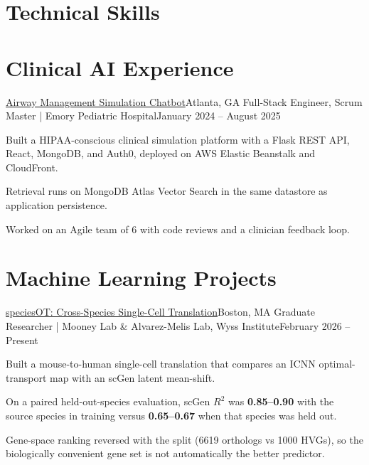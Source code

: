 \section{Technical Skills}
\resumeSubHeadingListStart
\resumeSubHeadingListEnd

\section{Clinical AI Experience}
\resumeSubHeadingListStart

  \resumeSubheading
    {\href{https://github.com/JunyiZhou-Conny/Airway-Management-Assistant}{Airway Management Simulation Chatbot}}{Atlanta, GA}
    {Full-Stack Engineer, Scrum Master | Emory Pediatric Hospital}{January 2024 -- August 2025}
    \resumeItemListStart
      \item Built a HIPAA-conscious clinical simulation platform with a Flask REST API, React, MongoDB, and Auth0, deployed on AWS Elastic Beanstalk and CloudFront.
      \item Retrieval runs on MongoDB Atlas Vector Search in the same datastore as application persistence.
      \item Worked on an Agile team of 6 with code reviews and a clinician feedback loop.
    \resumeItemListEnd

\resumeSubHeadingListEnd

\section{Machine Learning Projects}
\resumeSubHeadingListStart

  \resumeSubheading
    {\href{https://github.com/JunyiZhou-Conny/speciesOT}{speciesOT: Cross-Species Single-Cell Translation}}{Boston, MA}
    {Graduate Researcher | Mooney Lab \& Alvarez-Melis Lab, Wyss Institute}{February 2026 -- Present}
    \resumeItemListStart
      \item Built a mouse-to-human single-cell translation that compares an ICNN optimal-transport map with an scGen latent mean-shift.
      \item On a paired held-out-species evaluation, scGen $R^2$ was \textbf{0.85--0.90} with the source species in training versus \textbf{0.65--0.67} when that species was held out.
      \item Gene-space ranking reversed with the split (6619 orthologs vs 1000 HVGs), so the biologically convenient gene set is not automatically the better predictor.
    \resumeItemListEnd


